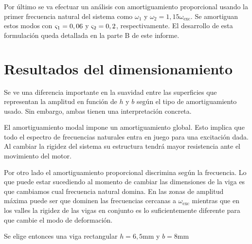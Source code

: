 \documentclass[onecolumn,10pt,titlepage,a4paper]{article}
\begin{document}
Por último se va efectuar un análisis con amortiguamiento proporcional usando la primer frecuencia natural del sistema como $\omega_1$ y $\omega_2 = 1,15 \omega_{\mathrm{exc}}$. Se amortiguan estos modos con $\varsigma_{1}=0,06$ y $\varsigma_2=0,2$, respectivamente. El desarrollo de esta formulación queda detallada en la parte B de este informe. 

\section{Resultados del dimensionamiento}

Se ve una diferencia importante en la suavidad entre las superficies que representan la amplitud en función de $h$ y $b$ según el tipo de amortiguamiento usado. Sin embargo, ambas tienen una interpretación concreta.

El amortiguamiento modal impone un amortiguamiento global. Esto implica que todo el espectro de frecuencias naturales entra en juego para una excitación dada. Al cambiar la rigidez del sistema su estructura tendrá mayor resistencia ante el movimiento del motor.

Por otro lado el amortiguamiento proporcional discrimina según la frecuencia. Lo que puede estar sucediendo al momento de cambiar las dimensiones de la viga es que cambiamos cual frecuencia natural domina. En las zonas de amplitud máxima puede ser que dominen las frecuencias cercanas a $\omega_{\mathrm{exc}}$ mientras que en los valles la rigidez de las vigas en conjunto es lo suficientemente diferente para que cambie el modo de deformación.



Se elige entonces una viga rectangular $h=6,5\si{\milli \meter}$ y $b=8\si{\milli \meter}$
\end{document}
